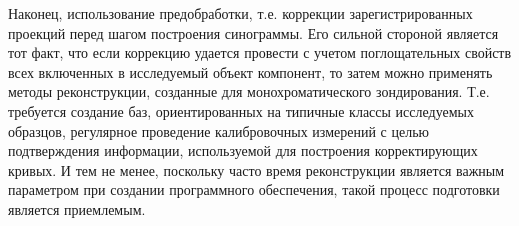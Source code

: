 Наконец, использование предобработки, т.е. коррекции зарегистрированных проекций перед шагом построения синограммы.
Его сильной стороной является тот факт, что если коррекцию удается провести с учетом поглощательных свойств всех включенных в исследуемый объект компонент, то затем можно применять методы реконструкции, созданные для монохроматического зондирования.
Т.е. требуется создание баз, ориентированных на типичные классы исследуемых образцов, регулярное проведение калибровочных измерений с целью подтверждения информации, используемой для построения корректирующих кривых.
И тем не менее, поскольку часто время реконструкции является важным параметром при создании программного обеспечения, такой процесс подготовки является приемлемым.